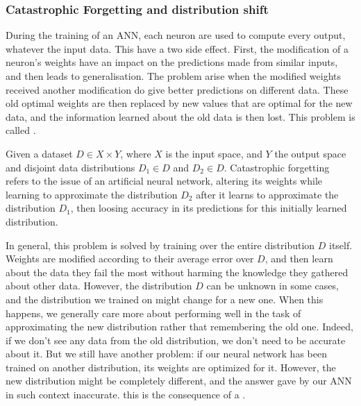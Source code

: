 \subsubsection{Catastrophic Forgetting and distribution shift}

During the training of an ANN, each neuron are used to compute every output, whatever the input data.
This have a two side effect.
First, the modification of a neuron's weights have an impact on the predictions made from similar inputs, and then leads
to generalisation.
The problem arise when the modified weights received another modification do give better predictions on different data.
These old optimal weights are then replaced by new values that are optimal for the new data, and the information learned
about the old data is then lost.
This problem is called .

\begin{definition}
    Given a dataset $D \in X \times Y$, where $X$ is the input space, and $Y$ the output space and disjoint data
    distributions $D_1 \in D$ and $D_2 \in D$.
    Catastrophic forgetting refers to the issue of an artificial neural network, altering its weights while learning to
    approximate the distribution $D_2$ after it learns to approximate the distribution $D_1$, then loosing accuracy
    in its predictions for this initially learned distribution.
\end{definition}

In general, this problem is solved by training over the entire distribution $D$ itself.
Weights are modified according to their average error over $D$, and then learn about the data they fail the most
without harming the knowledge they gathered about other data.
However, the distribution $D$ can be unknown in some cases, and the distribution we trained on might change for a new
one.
When this happens, we generally care more about performing well in the task of approximating the new
distribution rather that remembering the old one.
Indeed, if we don't see any data from the old distribution, we don't need to be accurate about it.
But we still have another problem: if our neural network has been trained on another distribution, its weights are
optimized for it.
However, the new distribution might be completely different, and the answer gave by our ANN in such context inaccurate.
this is the consequence of a .

